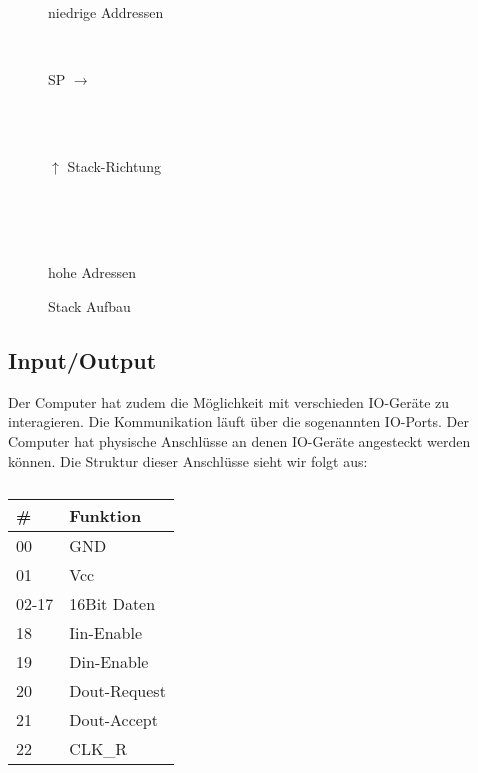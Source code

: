 \documentclass{scrartcl}
\begin{document}
\begin{figure}[h]
	\centering
	\caption{Stack Aufbau}
	\label{fig:stack-dir}

	\begin{bytefield}[leftcurly=., rightcurly=.]{16}
		\begin{rightwordgroup}{\small niedrige Addressen}
		\end{rightwordgroup} \\
		\begin{leftwordgroup}{\small SP $\rightarrow$}
		\end{leftwordgroup} \\
		 \\
		\begin{rightwordgroup}{\small $\uparrow$ Stack-Richtung}
		\end{rightwordgroup} \\
		 \\
		 \\
		\begin{rightwordgroup}{\small hohe Adressen}
		\end{rightwordgroup}
	\end{bytefield}

\end{figure}




\subsection{\label{section:io}Input/Output}

Der Computer hat zudem die Möglichkeit mit verschieden IO-Geräte zu interagieren.
Die Kommunikation läuft über die sogenannten IO-Ports.
Der Computer hat physische Anschlüsse an denen IO-Geräte angesteckt werden können.
Die Struktur dieser Anschlüsse sieht wir folgt aus:

\begin{center}
	\begin{table}[h]
		\caption{\label{table:IOPins}}
		\begin{tabular}{l | l}
			\# & Funktion \\
			\hline
			00 & GND \\
			01 & Vcc \\
			02-17 & 16Bit Daten \\
			18 & Iin-Enable \\
			19 & Din-Enable \\
			20 & Dout-Request \\
			21 & Dout-Accept \\
			22 & CLK\_R
 		\end{tabular}
	\end{table}
\end{center}
\end{document}
